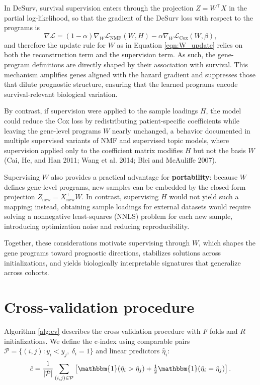 \documentclass[
]{article}
\begin{document}
In DeSurv, survival supervision enters through the projection
\(Z = W^\top X\) in the partial log-likelihood, so that the gradient of
the DeSurv loss with respect to the programs is \[
\nabla \mathcal{L} = (1-\alpha) \nabla_W \mathcal{L}_{\mathrm{NMF}}(W,H) - \alpha\nabla_W \mathcal{L}_{\mathrm{Cox}}(W,\beta),
\] and therefore the update rule for \(W\) as in Equation
\ref{eqn:W_update} relies on both the reconstruction term and the
supervision term. As such, the gene-program definitions are directly
shaped by their association with survival. This mechanism amplifies
genes aligned with the hazard gradient and suppresses those that dilute
prognostic structure, ensuring that the learned programs encode
survival-relevant biological variation.

By contrast, if supervision were applied to the sample loadings \(H\),
the model could reduce the Cox loss by redistributing patient-specific
coefficients while leaving the gene-level programs \(W\) nearly
unchanged, a behavior documented in multiple supervised variants of NMF
and supervised topic models, where supervision applied only to the
coefficient matrix modifies \(H\) but not the basis \(W\) (Cai, He, and
Han 2011; Wang et al. 2014; Blei and McAuliffe 2007).

Supervising \(W\) also provides a practical advantage for
\textbf{portability}: because \(W\) defines gene-level programs, new
samples can be embedded by the closed-form projection
\(Z_{\text{new}} = X_{\text{new}}^\top W\). In contrast, supervising
\(H\) would not yield such a mapping; instead, obtaining sample loadings
for external datasets would require solving a nonnegative least-squares
(NNLS) problem for each new sample, introducing optimization noise and
reducing reproducibility.

Together, these considerations motivate supervising through \(W\), which
shapes the gene programs toward prognostic directions, stabilizes
solutions across initializations, and yields biologically interpretable
signatures that generalize across cohorts.

\section{Cross-validation procedure}

Algorithm \ref{alg:cv} describes the cross validation procedure with
\(F\) folds and \(R\) initializations. We define the c-index using
comparable pairs \(\mathcal{P} = \{(i,j) : y_i < y_j,\ \delta_i = 1\}\)
and linear predictors \(\hat{\eta}_i\): \begin{equation}
\label{eqn:cindex}
\hat{c} =
\frac{1}{|\mathcal{P}|}
\sum_{(i,j)\in\mathcal{P}}
\left[
  \mathbbm{1}(\hat{\eta}_i > \hat{\eta}_j)
  + \tfrac{1}{2}\mathbbm{1}(\hat{\eta}_i = \hat{\eta}_j)
\right].
\end{equation}
\end{document}
